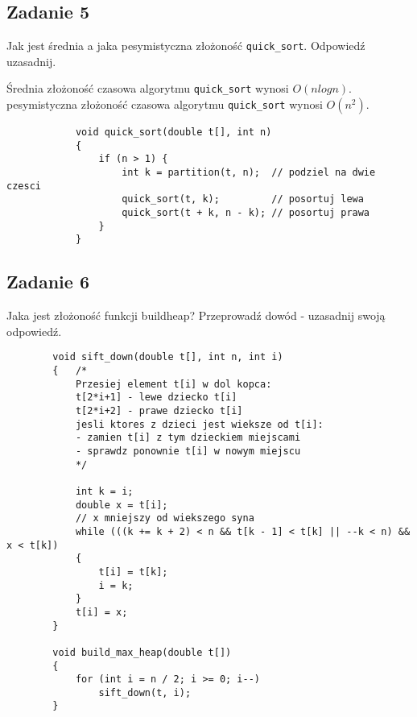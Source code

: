 \documentclass{article}
\begin{document}
    \pagebreak

    \subsection*{Zadanie 5}
    Jak jest średnia a jaka pesymistyczna złożoność \verb+quick_sort+. Odpowiedź uzasadnij.

    \begin{center}
    Średnia złożoność czasowa algorytmu \verb+quick_sort+ wynosi $O(nlogn)$. \\
    pesymistyczna złożoność czasowa algorytmu \verb+quick_sort+ wynosi $O(n^2)$. \\
    \end{center}

    \begin{lstlisting}
            void quick_sort(double t[], int n)
            {
                if (n > 1) {
                    int k = partition(t, n);  // podziel na dwie czesci
                    quick_sort(t, k);         // posortuj lewa
                    quick_sort(t + k, n - k); // posortuj prawa
                }
            }
    \end{lstlisting}

    \subsection*{Zadanie 6}
    Jaka jest złożoność funkcji buildheap? Przeprowadź dowód - uzasadnij swoją odpowiedź.

    \begin{lstlisting}
        void sift_down(double t[], int n, int i)
        {   /*
            Przesiej element t[i] w dol kopca:
            t[2*i+1] - lewe dziecko t[i]
            t[2*i+2] - prawe dziecko t[i]
            jesli ktores z dzieci jest wieksze od t[i]:
            - zamien t[i] z tym dzieckiem miejscami
            - sprawdz ponownie t[i] w nowym miejscu
            */

            int k = i;
            double x = t[i];
            // x mniejszy od wiekszego syna
            while (((k += k + 2) < n && t[k - 1] < t[k] || --k < n) && x < t[k]) 
            {
                t[i] = t[k];
                i = k;
            }
            t[i] = x;
        }

        void build_max_heap(double t[])
        {
            for (int i = n / 2; i >= 0; i--)
                sift_down(t, i);
        }
    \end{lstlisting}
    
\end{document}
